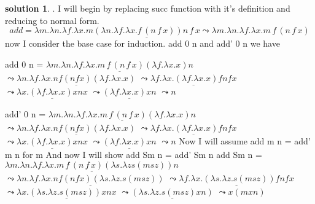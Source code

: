 \documentclass[10pt]{article}
\theoremstyle{definition}
\newtheorem{sol}{solution}
\begin{document}
\begin{sol}. \newline
	I will begin by replacing succ function with it's definition and reducing to normal form. \newline
	\[
		add = \lambda m.\lambda n.\lambda f.\lambda x.m \underline{(\lambda n. \lambda f. \lambda x. f \, (n\,f\,x))n\,f\,x}
		\leadsto \lambda m.\lambda n.\lambda f.\lambda x. m\,f\,(n\,f\,x)
	\]
	now I consider the base case for induction.
	add 0 n and add' 0 n
	we have

	add 0 n = \newline
	$ \underline{ \lambda m.\lambda n.\lambda f.\lambda x. m\,f\,(n\,f\,x) (\lambda f. \lambda x. x) n } $ \newline
	$\leadsto \underline{ \lambda n. \lambda f. \lambda x. n f (nfx)(\lambda f. \lambda x.x)}$ \newline
	$ \leadsto \underline{\lambda f. \lambda x. ( \lambda f . \lambda x.x) f n f x}$ \newline
	$ \leadsto \underline{\lambda x. ( \lambda f. \lambda x.x) x n x} $  \newline
	$ \leadsto \underline{(\lambda f. \lambda x. x) x n }$ \newline
	$ \leadsto n$ \newline

	add' 0 n = \newline
	$ \underline{ \lambda m.\lambda n.\lambda f.\lambda x. m\,f\,(n\,f\,x) (\lambda f. \lambda x. x) n } $ \newline
	$\leadsto \underline{ \lambda n. \lambda f. \lambda x. n f (nfx)(\lambda f. \lambda x.x)}$ \newline
	$ \leadsto \underline{\lambda f. \lambda x. ( \lambda f . \lambda x.x) f n f x}$ \newline
	$ \leadsto \underline{\lambda x. ( \lambda f. \lambda x.x) x n x} $  \newline
	$ \leadsto \underline{(\lambda f. \lambda x. x) x n }$ \newline
	$ \leadsto n$ \newline
	Now I will assume add m n = add' m n for m \newline
	And now I will show add Sm n = add' Sm n \newline
	add Sm n = \newline
	$ \underline{\lambda m.\lambda n.\lambda f.\lambda x. m\,f\,(n\,f\,x)( \lambda s. \lambda z s (m s z)) n }$ \newline
	$ \leadsto \underline{\lambda n. \lambda f. \lambda x. n f(n f x)( \lambda s. \lambda z. s (m s z))}$ \newline
	$ \leadsto \underline{ \lambda f. \lambda x. ( \lambda s. \lambda z. s (m s z))f n f x} $ \newline
	$ \leadsto \underline{ \lambda x. ( \lambda s. \lambda z. s (m s z))x n x} $ \newline
	$ \leadsto \underline{ ( \lambda s. \lambda z. s (m s z)x n)} $ \newline
	$ \leadsto x( m x n)$ \newline


\end{sol}
\end{document}
